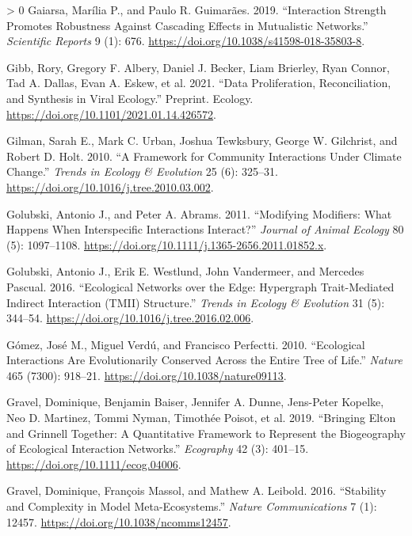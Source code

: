 \documentclass[10pt,oneside]{article}
\newlength{\cslhangindent}
\newenvironment{CSLReferences}[3] %
 {%
  \setlength{\parindent}{0pt}
  \ifodd #1 \everypar{\setlength{\hangindent}{\cslhangindent}}\ignorespaces\fi
  \ifnum #2 > 0
  \setlength{\parskip}{#2\baselineskip}
  \fi
 }%
 {}
\begin{document}
\begin{CSLReferences}{1}{0}
\leavevmode\hypertarget{ref-Gaiarsa2019IntStr}{}%
Gaiarsa, Marília P., and Paulo R. Guimarães. 2019. {``Interaction
Strength Promotes Robustness Against Cascading Effects in Mutualistic
Networks.''} \emph{Scientific Reports} 9 (1): 676.
\url{https://doi.org/10.1038/s41598-018-35803-8}.

\leavevmode\hypertarget{ref-Gibb2021DatPro}{}%
Gibb, Rory, Gregory F. Albery, Daniel J. Becker, Liam Brierley, Ryan
Connor, Tad A. Dallas, Evan A. Eskew, et al. 2021. {``Data
Proliferation, Reconciliation, and Synthesis in Viral Ecology.''}
Preprint. Ecology. \url{https://doi.org/10.1101/2021.01.14.426572}.

\leavevmode\hypertarget{ref-Gilman2010FraCom}{}%
Gilman, Sarah E., Mark C. Urban, Joshua Tewksbury, George W. Gilchrist,
and Robert D. Holt. 2010. {``A Framework for Community Interactions
Under Climate Change.''} \emph{Trends in Ecology \& Evolution} 25 (6):
325--31. \url{https://doi.org/10.1016/j.tree.2010.03.002}.

\leavevmode\hypertarget{ref-Golubski2011ModMod}{}%
Golubski, Antonio J., and Peter A. Abrams. 2011. {``Modifying Modifiers:
What Happens When Interspecific Interactions Interact?''} \emph{Journal
of Animal Ecology} 80 (5): 1097--1108.
\url{https://doi.org/10.1111/j.1365-2656.2011.01852.x}.

\leavevmode\hypertarget{ref-Golubski2016EcoNet}{}%
Golubski, Antonio J., Erik E. Westlund, John Vandermeer, and Mercedes
Pascual. 2016. {``Ecological Networks over the Edge: Hypergraph
Trait-Mediated Indirect Interaction (TMII) Structure.''} \emph{Trends in
Ecology \& Evolution} 31 (5): 344--54.
\url{https://doi.org/10.1016/j.tree.2016.02.006}.

\leavevmode\hypertarget{ref-Gomez2010EcoInt}{}%
Gómez, José M., Miguel Verdú, and Francisco Perfectti. 2010.
{``Ecological Interactions Are Evolutionarily Conserved Across the
Entire Tree of Life.''} \emph{Nature} 465 (7300): 918--21.
\url{https://doi.org/10.1038/nature09113}.

\leavevmode\hypertarget{ref-Gravel2019BriElt}{}%
Gravel, Dominique, Benjamin Baiser, Jennifer A. Dunne, Jens-Peter
Kopelke, Neo D. Martinez, Tommi Nyman, Timothée Poisot, et al. 2019.
{``Bringing Elton and Grinnell Together: A Quantitative Framework to
Represent the Biogeography of Ecological Interaction Networks.''}
\emph{Ecography} 42 (3): 401--15.
\url{https://doi.org/10.1111/ecog.04006}.

\leavevmode\hypertarget{ref-Gravel2016StaCom}{}%
Gravel, Dominique, François Massol, and Mathew A. Leibold. 2016.
{``Stability and Complexity in Model Meta-Ecosystems.''} \emph{Nature
Communications} 7 (1): 12457. \url{https://doi.org/10.1038/ncomms12457}.


\end{CSLReferences}
\end{document}
